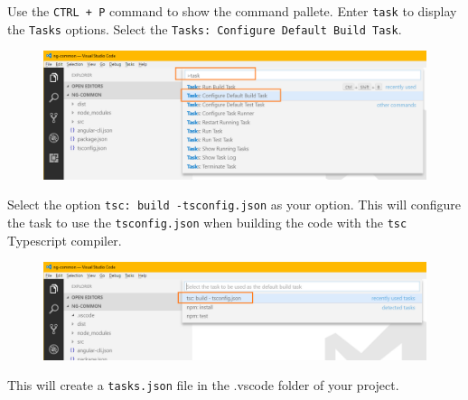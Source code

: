 \documentclass[]{book}
\newenvironment{Shaded}{\begin{snugshade}}{\end{snugshade}}
\newcommand{\KeywordTok}[1]{\textcolor[rgb]{0.13,0.29,0.53}{\textbf{#1}}}
\newcommand{\StringTok}[1]{\textcolor[rgb]{0.31,0.60,0.02}{#1}}
\newcommand{\CommentTok}[1]{\textcolor[rgb]{0.56,0.35,0.01}{\textit{#1}}}
\newcommand{\OperatorTok}[1]{\textcolor[rgb]{0.81,0.36,0.00}{\textbf{#1}}}
\newcommand{\NormalTok}[1]{#1}
\theoremstyle{definition}
\theoremstyle{definition}
\theoremstyle{definition}
\theoremstyle{remark}
\begin{document}
Use the \texttt{CTRL\ +\ P} command to show the command pallete. Enter
\texttt{task} to display the \texttt{Tasks} options. Select the
\texttt{Tasks:\ Configure\ Default\ Build\ Task}.

\begin{figure}
\centering
\includegraphics{images/configure-default-build-task.png}
\caption{}
\end{figure}

Select the option \texttt{tsc:\ build\ -tsconfig.json} as your option.
This will configure the task to use the \texttt{tsconfig.json} when
building the code with the \texttt{tsc} Typescript compiler.

\begin{figure}
\centering
\includegraphics{images/select-default-task.png}
\caption{}
\end{figure}

This will create a \texttt{tasks.json} file in the .vscode folder of
your project.

\begin{Shaded}
\end{Shaded}
\end{document}
